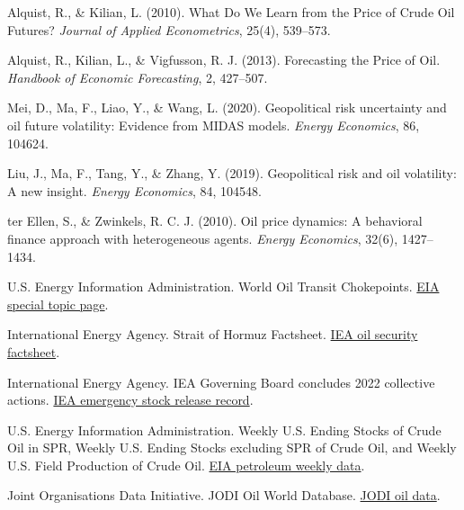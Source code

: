 \begin{enumerate}[label={[\arabic*]},leftmargin=2.2em,itemsep=0.42em,topsep=0.25em]
\item
Alquist, R., \& Kilian, L. (2010). What Do We Learn from the Price of Crude Oil Futures? \textit{Journal of Applied Econometrics}, 25(4), 539--573.

\item
Alquist, R., Kilian, L., \& Vigfusson, R. J. (2013). Forecasting the Price of Oil. \textit{Handbook of Economic Forecasting}, 2, 427--507.

\item
Mei, D., Ma, F., Liao, Y., \& Wang, L. (2020). Geopolitical risk uncertainty and oil future volatility: Evidence from MIDAS models. \textit{Energy Economics}, 86, 104624.

\item
Liu, J., Ma, F., Tang, Y., \& Zhang, Y. (2019). Geopolitical risk and oil volatility: A new insight. \textit{Energy Economics}, 84, 104548.

\item
ter Ellen, S., \& Zwinkels, R. C. J. (2010). Oil price dynamics: A behavioral finance approach with heterogeneous agents. \textit{Energy Economics}, 32(6), 1427--1434.

\item
U.S. Energy Information Administration. World Oil Transit Chokepoints. \href{https://www.eia.gov/international/analysis/special-topics/World_Oil_Transit_Chokepoints}{EIA special topic page}.

\item
International Energy Agency. Strait of Hormuz Factsheet. \href{https://www.iea.org/about/oil-security-and-emergency-response/strait-of-hormuz}{IEA oil security factsheet}.

\item
International Energy Agency. IEA Governing Board concludes 2022 collective actions. \href{https://www.iea.org/news/iea-governing-board-concludes-2022-collective-actions}{IEA emergency stock release record}.

\item
U.S. Energy Information Administration. Weekly U.S. Ending Stocks of Crude Oil in SPR, Weekly U.S. Ending Stocks excluding SPR of Crude Oil, and Weekly U.S. Field Production of Crude Oil. \href{https://www.eia.gov/dnav/pet/pet_sum_sndw_dcus_nus_w.htm}{EIA petroleum weekly data}.

\item
Joint Organisations Data Initiative. JODI Oil World Database. \href{https://www.jodidata.org/oil/}{JODI oil data}.


\end{enumerate}

